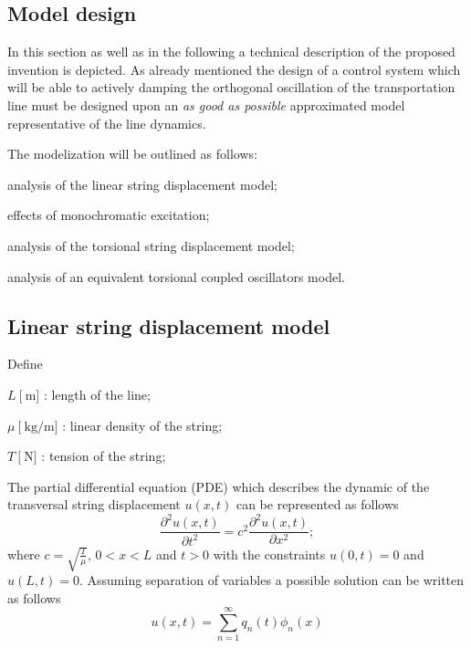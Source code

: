 \documentclass[12pt,a4paper]{scrartcl}
\begin{document}
\begin{onehalfspace}
%
\pagebreak
\section{Model design}
In this section as well as in the following a technical description of the proposed invention is depicted. As already mentioned the design of a control system which will be able to actively damping the orthogonal oscillation of the transportation line must be designed upon an \textit{as good as possible} approximated model representative of the line dynamics.

The modelization will be outlined as follows:
\begin{myitemize_1}
	\item[--] analysis of the linear string displacement model;
	\item[--] effects of monochromatic excitation;
	\item[--] analysis of the torsional string displacement model;
	\item[--] analysis of an equivalent torsional coupled oscillators model.
\end{myitemize_1}

\subsection{Linear string displacement model}
Define
\begin{myitemize_1}
	\item[--] $L\ \Big[\SI{}{\meter}\Big]$ : length of the line;
	\item[--] $\mu\ \Big[\SI{}{\kilogram\per\meter}\Big]$ : linear density of the string;
	\item[--] $T\ \Big[\SI{}{\newton}\Big]$ : tension of the string;
\end{myitemize_1}
The partial differential equation (PDE) which describes the dynamic of the transversal string displacement $u(x,t)$ can be represented as follows 
	\begin{equation}
	\frac{\partial^2 u(x,t)}{\partial t^2} = c^2\frac{\partial^2 u(x,t)}{\partial x^2};
\end{equation}
where $c = \sqrt{\frac{T}{\mu}}$, $0 < x < L$ and $t > 0$ with the constraints $u(0,t) = 0$ and $u(L,t) = 0$. Assuming separation of variables a possible solution can be written as follows 
\begin{equation}
	u(x,t) = \sum_{n=1}^{\infty}q_n(t)\phi_n(x)
\end{equation}


\end{onehalfspace}
\end{document}
